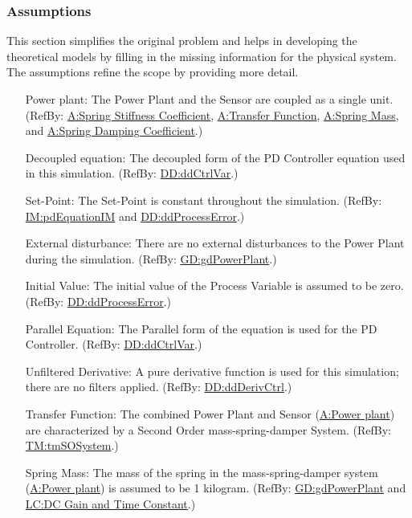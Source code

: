 \documentclass[12pt]{article}
\begin{document}
\subsubsection{Assumptions}
\label{Sec:Assumps}
This section simplifies the original problem and helps in developing the theoretical models by filling in the missing information for the physical system. The assumptions refine the scope by providing more detail.

\begin{itemize}
\item[Power plant:\phantomsection\label{pwrPlant}]{The Power Plant and the Sensor are coupled as a single unit. (RefBy: \hyperref[stiffnessCoeffSpring]{A:Spring Stiffness Coefficient}, \hyperref[pwrPlantTxFnx]{A:Transfer Function}, \hyperref[massSpring]{A:Spring Mass}, and \hyperref[dampingCoeffSpring]{A:Spring Damping Coefficient}.)}
\item[Decoupled equation:\phantomsection\label{decoupled}]{The decoupled form of the PD Controller equation used in this simulation. (RefBy: \hyperref[DD:ddCtrlVar]{DD:ddCtrlVar}.)}
\item[Set-Point:\phantomsection\label{setPoint}]{The Set-Point is constant throughout the simulation. (RefBy: \hyperref[IM:pdEquationIM]{IM:pdEquationIM} and \hyperref[DD:ddProcessError]{DD:ddProcessError}.)}
\item[External disturbance:\phantomsection\label{externalDisturb}]{There are no external disturbances to the Power Plant during the simulation. (RefBy: \hyperref[GD:gdPowerPlant]{GD:gdPowerPlant}.)}
\item[Initial Value:\phantomsection\label{initialValue}]{The initial value of the Process Variable is assumed to be zero. (RefBy: \hyperref[DD:ddProcessError]{DD:ddProcessError}.)}
\item[Parallel Equation:\phantomsection\label{parallelEq}]{The Parallel form of the equation is used for the PD Controller. (RefBy: \hyperref[DD:ddCtrlVar]{DD:ddCtrlVar}.)}
\item[Unfiltered Derivative:\phantomsection\label{unfilteredDerivative}]{A pure derivative function is used for this simulation; there are no filters applied. (RefBy: \hyperref[DD:ddDerivCtrl]{DD:ddDerivCtrl}.)}
\item[Transfer Function:\phantomsection\label{pwrPlantTxFnx}]{The combined Power Plant and Sensor (\hyperref[pwrPlant]{A:Power plant}) are characterized by a Second Order mass-spring-damper System. (RefBy: \hyperref[TM:tmSOSystem]{TM:tmSOSystem}.)}
\item[Spring Mass:\phantomsection\label{massSpring}]{The mass of the spring in the mass-spring-damper system (\hyperref[pwrPlant]{A:Power plant}) is assumed to be 1 kilogram. (RefBy: \hyperref[GD:gdPowerPlant]{GD:gdPowerPlant} and \hyperref[likeChgPP]{LC:DC Gain and Time Constant}.)}

\end{itemize}
\end{document}
